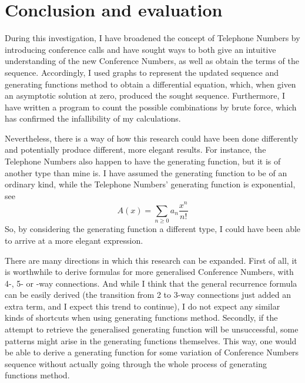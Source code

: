 \documentclass[stu, 11pt, a4paper, floatsintext]{apa7}
\begin{document}
	\section{Conclusion and evaluation}
	During this investigation, I have broadened the concept of Telephone Numbers by introducing conference calls and have sought ways to both give an intuitive understanding of the new Conference Numbers, as well as obtain the terms of the sequence. Accordingly, I used graphs to represent the updated sequence and generating functions method to obtain a differential equation, which, when given an asymptotic solution at zero, produced the sought sequence. Furthermore, I have written a program to count the possible combinations by brute force, which has confirmed the infallibility of my calculations.
	
	Nevertheless, there is a way of how this research could have been done differently and potentially produce different, more elegant results. For instance, the Telephone Numbers also happen to have the generating function, but it is of another type than mine is. I have assumed the generating function to be of an ordinary kind, while the Telephone Numbers' generating function is exponential, see
	\begin{equation}
		\label{eq14:exp_generating_func_expr}
		A(x)=\sum_{n\geq 0}a_n\frac{x^n}{n!}
	\end{equation}
	So, by considering the generating function a different type, I could have been able to arrive at a more elegant expression.
	
	There are many directions in which this research can be expanded. First of all, it is worthwhile to derive formulas for more generalised Conference Numbers, with 4-, 5- or -way connections. And while I think that the general recurrence formula can be easily derived (the transition from 2 to 3-way connections just added an extra term, and I expect this trend to continue), I do not expect any similar kinds of shortcuts when using generating functions method. Secondly, if the attempt to retrieve the generalised generating function will be unsuccessful, some patterns might arise in the generating functions themselves. This way, one would be able to derive a generating function for some variation of Conference Numbers sequence without actually going through the whole process of generating functions method.
	\printbibliography
	\appendix
\end{document}
